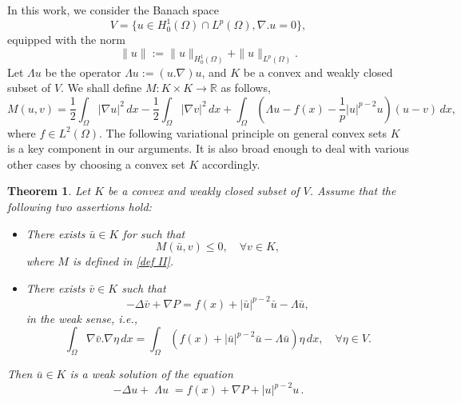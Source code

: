 \documentclass[10pt,a4paper]{amsart}
\numberwithin{equation}{section}
\newtheorem{theorem}{Theorem}[section]
\begin{document}
In this work,  we  consider the Banach space
\[
V= \{ u\in H_0^1(\Omega)\cap L^p(\Omega),\nabla . u=0\},
\]
equipped with the  norm
\[
\rVert u \rVert:= \rVert u \rVert_{ H_0^{1}(\Omega)}
+\rVert u \rVert_{ L^{p}(\Omega)}.
\]
Let \(\Lambda u\) be the operator \(\Lambda u := (u . \nabla)u\),
and \( K\) be a convex and weakly closed subset of \(V\).
We shall define \( M : K \times K \to\mathbb{R}\) as follows,
\begin{equation}\label{def II}
    M(u,v)=\frac{1}{2}\int_{\Omega} |\nabla u|^2\,dx
    -\frac{1}{2}\int_{\Omega} |\nabla v|^2\,dx
    +\int_\Omega (\Lambda u-f(x)  -\frac{1}{p}|u|^{p-2}u) (u-v)\,dx,
\end{equation}
where \(f \in L^2(\Omega)\). The following variational principle on general convex
sets $K$  is a  key component in our arguments. It is also broad enough to deal with
various other cases by choosing a convex set $K$ accordingly.

\setcounter{theorem}{0}
\begin{theorem}\label{variational}
Let  \( K\) be a convex and weakly closed subset of \(V\). Assume that the following
two assertions hold:
\begin{itemize}
\item[(i)] There  exists \(\bar{u} \in K\) for   such that
    \[
    M(\bar{u}, v)\leq 0,\quad  \forall v\in  K,
    \]
    where \(M \) is defined in \eqref{def II}.

\item[(ii)] There exists \(\bar{v} \in K\) such that \[-\Delta \bar{v} + \nabla P = f(x) +|\bar{u}|^{p-2}\bar{u} - \Lambda \bar{u},\]
    in the weak sense, i.e.,
\[
   \int_\Omega\nabla\bar{v}.\nabla\eta\,dx
   =\int_\Omega (f(x)  +|\bar{u}|^{p-2}\bar{u} -
   \Lambda \bar{u})\eta\,dx,\quad \forall\eta\in V.
\]
\end{itemize}
Then \(\bar{u} \in K\) is a weak solution of the equation
\[
-\Delta u+ \;\Lambda u \; = f(x) + \nabla P +|u|^{p-2}u \,.
\]
\end{theorem}
\end{document}
